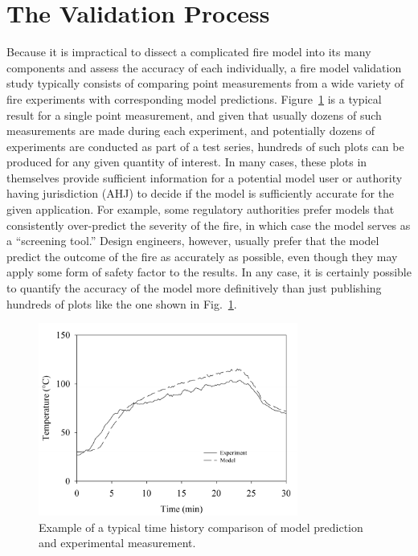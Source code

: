 \section{The Validation Process}

Because it is impractical to dissect a complicated fire model into its many components and assess the accuracy of each individually,
a fire model validation study typically consists of comparing point measurements from a wide variety of fire experiments with corresponding model predictions.
Figure~\ref{temp_history} is a typical result for a single point measurement, and given that usually dozens of such measurements are made during each experiment,
and potentially dozens of experiments are conducted as part of a test series, hundreds of such plots can be produced for any given quantity of interest. In many cases, these
plots in themselves provide sufficient information for a potential model user or authority having jurisdiction (AHJ) to decide if the model is sufficiently accurate for the
given application. For example, some regulatory
authorities prefer models that consistently over-predict the severity of the fire, in which case the model serves as a ``screening tool.'' Design engineers, however,
usually prefer that the model predict the outcome of the fire as accurately as possible, even though they may apply some form of safety factor to the results.
In any case, it is certainly possible to quantify the accuracy of the model more definitively than just publishing
hundreds of plots like the one shown in Fig.~\ref{temp_history}.

\begin{figure}[t]
\begin{center}
\includegraphics[height=2.5in]{FIGURES/sample_time_history}
\end{center}
\caption[Sample time history plots.]{Example of a typical time history comparison of model prediction and experimental measurement.}
\label{temp_history}
\end{figure}

